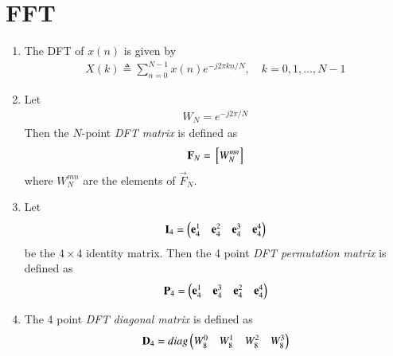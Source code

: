 \documentclass[journal,12pt,twocolumn]{IEEEtran}
\renewcommand\thesection{\arabic{section}}
\begin{document}
\section{FFT}	
\begin{enumerate}[label=\arabic*.,ref=\thesection.\theenumi]
	\item The DFT of $x(n)$ is given by
	\begin{align}
		X(k) \triangleq \sum_{n=0}^{N-1} x(n) e^{-j 2 \pi k n / N}, \quad k=0,1, \ldots, N-1
	\end{align}
	\item Let 
	\begin{align}
		W_{N} = e^{-j2\pi/N} 
	\end{align}
	Then the $N$-point {\em DFT matrix} is defined as 
	\begin{align}
		\mathbf{F}_{N} = {}\left[W_{N}^{mn}\right]
	\end{align}
	where $W_{N}^{mn}$ are the elements of $\vec{F}_{N}$.
	\item Let 
	\begin{align}
		\mathbf{I}_4 = \begin{pmatrix}\mathbf{e}_4^{1} &\mathbf{e}_4^{2} &\mathbf{e}_4^{3} &\mathbf{e}_4^{4} \end{pmatrix}
	\end{align}
	be the $4\times 4$ identity matrix.  Then the 4 point {\em DFT permutation matrix} is defined as 
	\begin{align}
		\mathbf{P}_4 = \begin{pmatrix}\mathbf{e}_4^{1} &\mathbf{e}_4^{3} &\mathbf{e}_4^{2} &\mathbf{e}_4^{4} \end{pmatrix}
	\end{align}
	\item The 4 point {\em DFT diagonal matrix} is defined as 
	\begin{align}
		\mathbf{D}_4 = diag\begin{pmatrix}W_{8}^{0} & W_{8}^{1} & W_{8}^{2} & W_{8}^{3}\end{pmatrix}
	\end{align}



\end{enumerate}
\end{document}

